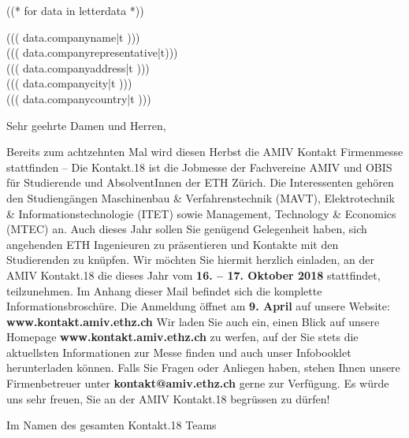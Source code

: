 \documentclass[kontakt]{amivletter}
\begin{document}
((* for data in letterdata *))



\begin{letter}{%
    ((( data.companyname|t )))\\
    ((( data.companyrepresentative|t)))\\
    ((( data.companyaddress|t )))\\
    ((( data.companycity|t )))\\
    ((( data.companycountry|t )))%
}


\opening{Sehr geehrte Damen und Herren,}

Bereits zum achtzehnten Mal wird diesen Herbst die AMIV Kontakt Firmenmesse stattfinden --
Die Kontakt.18 ist die Jobmesse der Fachvereine AMIV und OBIS für Studierende und AbsolventInnen der ETH Zürich.
Die Interessenten gehören den Studiengängen Maschinenbau \& Verfahrenstechnik (MAVT),
Elektrotechnik \& Informationstechnologie (ITET) sowie Management, Technology \& Economics (MTEC) an.
Auch dieses Jahr sollen Sie genügend Gelegenheit haben,
sich angehenden ETH Ingenieuren zu präsentieren und Kontakte mit den Studierenden zu knüpfen.
\medbreak
Wir möchten Sie hiermit herzlich einladen, an der AMIV Kontakt.18 die dieses Jahr vom \textbf{16. -- 17. Oktober 2018} stattfindet, teilzunehmen.
Im Anhang dieser Mail befindet sich die komplette Informationsbroschüre.
\medbreak
\noindent Die Anmeldung öffnet am \textbf{9. April} auf unsere Website: \textbf{www.kontakt.amiv.ethz.ch}
\medbreak
Wir laden Sie auch ein, einen Blick auf unsere Homepage \textbf{www.kontakt.amiv.ethz.ch} zu werfen,
auf der Sie stets die aktuellsten Informationen zur Messe finden und auch unser Infobooklet herunterladen können.
\medbreak
Falls Sie Fragen oder Anliegen haben, stehen Ihnen unsere Firmenbetreuer unter \textbf{kontakt@amiv.ethz.ch} gerne zur Verfügung. 
Es würde uns sehr freuen, Sie an der AMIV Kontakt.18 begrüssen zu dürfen! 

\closing{Im Namen des gesamten Kontakt.18 Teams}


\end{letter}

\end{document}
